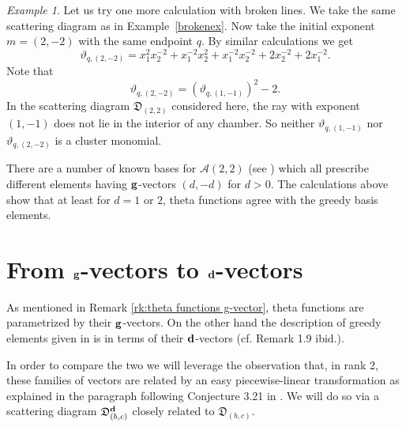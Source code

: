 \documentclass[11pt]{amsart}
\newcommand{\saySS}[1]{\say[SS]{#1}}
\newcommand{\sayMG}[1]{\say[MG]{#1}}
\theoremstyle{remark}
\newtheorem{example}[theorem]{Example}
\numberwithin{equation}{section}
\newcommand{\cA}{\mathcal{A}}
\newcommand{\fD}{\mathfrak{D}}
\newcommand{\bfd}{{\bf d}}
\newcommand{\bfg}{{\bf g}}
\begin{document}
\begin{example}
  Let us try one more calculation with broken lines. We take the same scattering
  diagram as in Example~\ref{brokenex}. Now take the initial exponent $m=(2,-2)$
  with the same endpoint $q$. By similar calculations we get 
  \[ 
    \vartheta _{q, (2,-2)} = 
    x_1^2 x_2^{-2} + x_1^{-2}x_2^2 + x_1^{-2}x_2^{-2} + 2 x_2^{-2} + 2x_1^{-2}.  
  \]
  Note that 
  \[ 
    \vartheta _{q, (2,-2)} = 
    \left(\vartheta_{q, (1,-1)}\right) ^2 -2. 
  \]
  In the scattering diagram $\fD_{(2,2)}$ considered here, the ray with exponent $(1,-1)$ does
  not lie in the interior of any chamber. So neither $\vartheta_{q,(1,-1)}$ nor 
  $\vartheta _{q, (2,-2)}$ is a cluster monomial.

  There are a number of known bases for $\cA(2,2)$ (see \cite{Dup,MSW,LLZ}) which all prescribe different elements
  having $\bfg$-vectors $(d,-d)$ for $d>0$. The
  calculations above show that at least for $d=1$ or $2$, theta functions agree with
  the greedy basis elements.
\end{example}


\section{From $\bfg$-vectors to $\bfd$-vectors}
As mentioned in Remark \ref{rk:theta functions g-vector}, theta functions are
parametrized by their $\bfg$-vectors. On the other hand the description of
greedy elements given in \cite{LLZ} is in terms of their $\bfd$-vectors (cf.
Remark 1.9 ibid.). 

In order to compare the two we will leverage the observation that, in rank 2,
these families of vectors are related by an easy piecewise-linear transformation
as explained in the paragraph following Conjecture 3.21 in \cite{RS}. We will do
so via a scattering diagram $\fD^{\bfd}_{(b,c)}$ closely related to
$\fD_{(b,c)}$.
\end{document}
